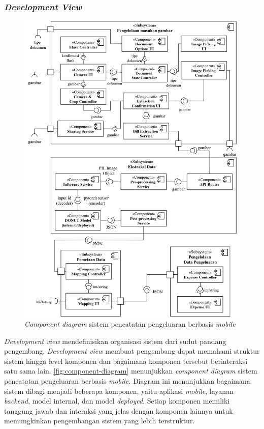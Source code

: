 \subsubsection{\emph{Development View}}
\label{subsubsec:development-view}

\begin{figure}[htbp]
    \centering
    \includegraphics[width=1\textwidth]{images/component-diagram.png}
    \caption{\emph{Component diagram} sistem pencatatan pengeluaran berbasis \emph{mobile}}
    \label{fig:component-diagram}
\end{figure}

\emph{Development view} mendefinisikan organisasi sistem dari sudut pandang pengembang. \emph{Development view} membuat pengembang dapat memahami struktur sistem hingga level komponen dan bagaimana komponen tersebut berinteraksi satu sama lain. \autoref{fig:component-diagram} menunjukkan \emph{component diagram} sistem pencatatan pengeluaran berbasis \emph{mobile}. Diagram ini menunjukkan bagaimana sistem dibagi menjadi beberapa komponen, yaitu aplikasi \emph{mobile}, layanan \emph{backend}, model internal, dan model \emph{deployed}. Setiap komponen memiliki tanggung jawab dan interaksi yang jelas dengan komponen lainnya untuk memungkinkan pengembangan sistem yang lebih terstruktur.

